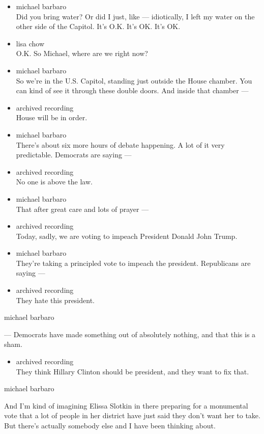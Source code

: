 \begin{itemize}
\item
  michael barbaro\\
  Did you bring water? Or did I just, like --- idiotically, I left my
  water on the other side of the Capitol. It's O.K. It's OK. It's OK.
\item
  lisa chow\\
  O.K. So Michael, where are we right now?
\item
  michael barbaro\\
  So we're in the U.S. Capitol, standing just outside the House chamber.
  You can kind of see it through these double doors. And inside that
  chamber ---
\item
  archived recording\\
  House will be in order.
\item
  michael barbaro\\
  There's about six more hours of debate happening. A lot of it very
  predictable. Democrats are saying ---
\item
  archived recording\\
  No one is above the law.
\item
  michael barbaro\\
  That after great care and lots of prayer ---
\item
  archived recording\\
  Today, sadly, we are voting to impeach President Donald John Trump.
\item
  michael barbaro\\
  They're taking a principled vote to impeach the president. Republicans
  are saying ---
\item
  archived recording\\
  They hate this president.
\end{itemize}

michael barbaro

--- Democrats have made something out of absolutely nothing, and that
this is a sham.

\begin{itemize}
\tightlist
\item
  archived recording\\
  They think Hillary Clinton should be president, and they want to fix
  that.
\end{itemize}

michael barbaro

And I'm kind of imagining Elissa Slotkin in there preparing for a
monumental vote that a lot of people in her district have just said they
don't want her to take. But there's actually somebody else and I have
been thinking about.

